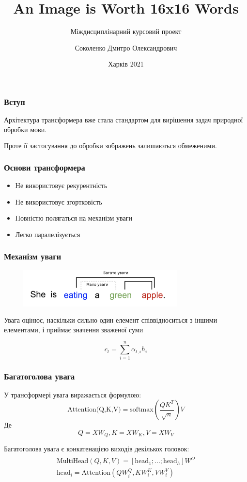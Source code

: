 \documentclass{beamer}
\title{An Image is Worth 16x16 Words}
\subtitle{Міждисциплінарний курсовий проект}
\author[Соколенко]{
    Соколенко Дмитро Олександрович
}
\institute[ХНУРЕ]{ІТШІ-18-1 
    \\ \vspace{0.4cm}
    Керівник: Вітько О. В.
}
\date{Харків 2021}
\begin{document}
\frame{\titlepage}

\begin{frame}
    \frametitle{Вступ}
    Архітектура трансформера вже стала стандартом для
    вирішення задач природної обробки мови.

    Проте її застосування до обробки зображень залишаються
    обмеженими.
    
\end{frame}

\begin{frame}
    \frametitle{Основи трансформера}
    \begin{itemize}
        \item Не використовує рекурентність
        \item Не використовує згортковість
        \item Повністю полягаться на механізм уваги
        \item Легко паралелізується
    \end{itemize}

\end{frame}

\begin{frame}
    \frametitle{Механізм уваги}
    \begin{figure}[H]
        \centering
        \includegraphics[width=0.75\textwidth]{sentence-example-attention.png}
    \end{figure}
    Увага оцінює, наскільки сильно один елемент
    співвідноситься з іншими елементами, і приймає значення
    зваженої суми

    \begin{equation*}
        c_t = \sum^n_{i=1}\alpha_{t,i} h_i
    \end{equation*}
    
\end{frame}

\begin{frame}
    \frametitle{Багатоголова увага}

    У трансформері увага виражається формулою:
    \begin{equation*}
        \text{Attention(Q,K,V)} = \text{softmax}(\frac{QK^T}{\sqrt{n}})V
    \end{equation*}
    Де
    \begin{equation*}
        Q=XW_Q, K=XW_K, V=XW_V
    \end{equation*}

    Багатоголова увага є конкатенацією виходів декількох головок:
    \begin{gather*}
    \begin{aligned}
        \text{MultiHead}(Q,K,V)= [\text{head}_1; ...; \text{head}_h]W^O \\
        \text{head}_i = \text{Attention}(QW^Q_i, KW^K_i, VW^V_i)
    \end{aligned}
        \end{gather*}
\end{frame}
\end{document}
